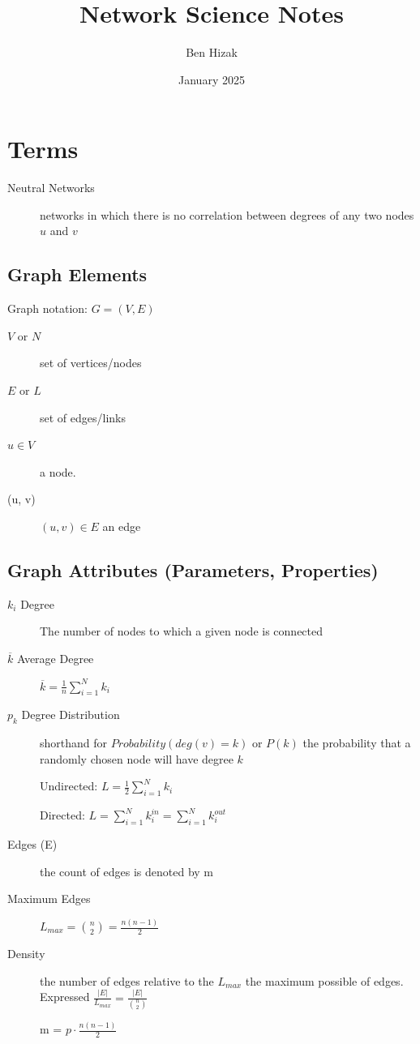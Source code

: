 \documentclass{article}
\title{Network Science Notes}
\author{Ben Hizak}
\date{January 2025}
\begin{document}
\maketitle 



\section{Terms}

\begin{description}
    \item [Neutral Networks] networks in which there is no correlation between degrees of any two nodes $u$ and $v$
\end{description}
\subsection{Graph Elements}
Graph notation: $G = (V, E)$

\begin{description}
    \item[$V$ or $N$] set of vertices/nodes
    \item[$E$ or $L$] set of edges/links
    \item[$u \in V$] a node.
    \item[(u, v)] $(u, v) \in E$ an edge 
\end{description}
\subsection{Graph Attributes (Parameters, Properties)}
\begin{description}
    \item[$k_i$ Degree] The number of nodes to which a given node is connected
    \item[$\overline{k}$ Average Degree] $\overline{k}= \frac{1}{n}\sum\limits_{i = 1}^N {k_i } $
    \item[$p_k$ Degree Distribution] shorthand for $Probability (deg(v) = k)$ or $P(k)$ the probability that a randomly chosen node will have degree $k$

Undirected:             $L = \frac{1}{2}\sum\limits_{i = 1}^N {k_i }$ 

Directed: $L = \sum\limits_{i = 1}^N {k_i^{in} }  = \sum\limits_{i = 1}^N {k_i^{out} }$
    \item [Edges (E)]the count of edges is denoted by m
    \item[Maximum Edges]  $L_{max}={\binom{n}{2}}=\frac{n(n-1)}{2}$
    \item [Density] the number of edges relative to the $L_{max}$ the maximum possible of edges. Expressed $\frac{|E|}{L_{max}} =  \frac{|E|}{\binom{n}{2}}$

m = $p\cdot\frac{n(n-1)}{2}$
\end{description}
\end{document}
